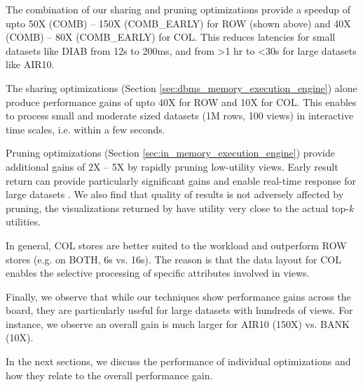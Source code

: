\begin{denselist} 
\item The combination of our sharing and pruning optimizations provide a speedup of upto 50X (COMB) -- 150X (COMB\_EARLY) for ROW (shown above) and 40X (COMB) -- 80X (COMB\_EARLY) for COL.
This reduces latencies for small datasets like DIAB from 12s to 200ms, and from >1 hr to <30s for large datasets like AIR10.
\item The sharing optimizations (Section \ref{sec:dbms_memory_execution_engine}) alone produce performance gains of upto 40X for ROW and 10X for COL. This enables \SeeDB to process small and moderate sized datasets (1M rows, 100 views) in interactive time scales, i.e. within a few seconds.
\item Pruning optimizations (Section \ref{sec:in_memory_execution_engine}) provide additional gains of 2X -- 5X by rapidly pruning low-utility views. Early result return can provide particularly significant gains and enable real-time response for large datasets . We also find that quality of results is not adversely affected by pruning, the visualizations returned by \SeeDB have utility very close to the actual top-$k$ utilities.
\item In general, COL stores are better suited to the \SeeDB workload and outperform ROW stores (e.g. on BOTH, 6s vs. 16s). The reason is that the data layout for COL enables the selective processing of specific attributes involved in views. 
\item Finally, we observe that while our techniques show performance gains across the board, they are particularly useful for large datasets with hundreds of views. For instance, we observe an overall gain is much larger for AIR10 (150X) vs. BANK (10X).
\end{denselist}

In the next sections, we discuss the performance of individual optimizations and how they relate to the overall performance gain.



